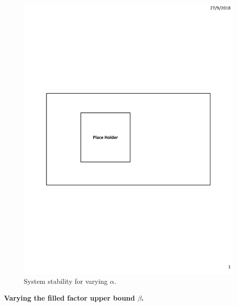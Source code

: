 \begin{figure}[h]
\begin{minipage}{0.18\linewidth}
		\includegraphics[width=\linewidth]{fig/PlaceHolder.pdf}
		\centerline{\dsrandom}
	\end{minipage}
	\caption{System stability for varying $\alpha$.}
	\label{fig:vary-alpha-stability}
\end{figure}

\vspace{1mm}\noindent\textbf{Varying the filled factor upper bound $\beta$.}

